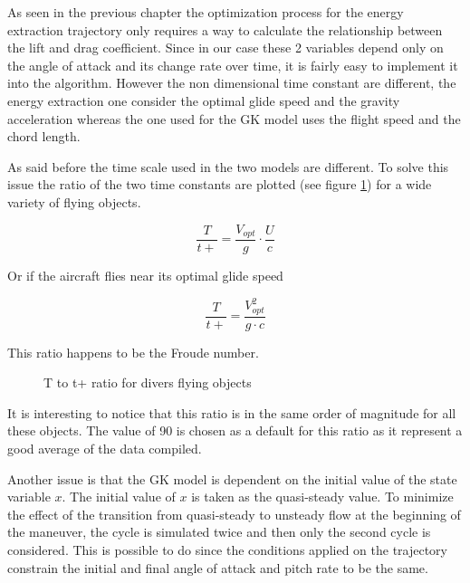 
\par As seen in the previous chapter the optimization process for the energy extraction trajectory only requires a way to calculate the relationship between the lift and drag coefficient.
Since in our case these 2 variables depend only on the angle of attack and its change rate over time, it is fairly easy to implement it into the algorithm.
However the non dimensional time constant are different, the energy extraction one consider the optimal glide speed and the gravity acceleration whereas the one used for the GK model uses the flight speed and the chord length.

As said before the time scale used in the two models are different.
To solve this issue the ratio of the two time constants are plotted (see figure \ref{fig:T_t+_ratio}) for a wide variety of flying objects.

\begin{equation}
  \frac{T}{t+}=\frac{V_{opt}}{g} \cdot \frac{U}{c}
  \label{eqn:T_t+}
\end{equation}

Or if the aircraft flies near its optimal glide speed

\begin{equation}
  \frac{T}{t+}=\frac{V_{opt}^2}{g \cdot c}
  \label{eqn:T_t+_ratio}
\end{equation}

This ratio happens to be the Froude number.


\begin{figure}[ht]
  \begin{center}
  \end{center}
  \caption{T to t+ ratio for divers flying objects}
  \label{fig:T_t+_ratio}
\end{figure}

\par It is interesting to notice that this ratio is in the same order of magnitude for all these objects.
The value of 90 is chosen as a default for this ratio as it represent a good average of the data compiled.


\par Another issue is that the GK model is dependent on the initial value of the state variable $x$.
The initial value of $x$ is taken as the quasi-steady value.
To minimize the effect of the transition from quasi-steady to unsteady flow at the beginning of the maneuver, the cycle is simulated twice and then only the second cycle is considered.
This is possible to do since the conditions applied on the trajectory constrain the initial and final angle of attack and pitch rate to be the same.


